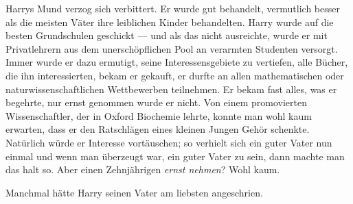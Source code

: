 Harrys Mund verzog sich verbittert. Er wurde gut behandelt, vermutlich besser als die meisten Väter ihre leiblichen Kinder behandelten. Harry wurde auf die besten Grundschulen geschickt — und als das nicht ausreichte, wurde er mit Privatlehrern aus dem unerschöpflichen Pool an verarmten Studenten versorgt. Immer wurde er dazu ermutigt, seine Interessensgebiete zu vertiefen, alle Bücher, die ihn interessierten, bekam er gekauft, er durfte an allen mathematischen oder naturwissenschaftlichen Wettbewerben teilnehmen. Er bekam fast alles, was er begehrte, nur ernst genommen wurde er nicht. Von einem promovierten Wissenschaftler, der in Oxford Biochemie lehrte, konnte man wohl kaum erwarten, dass er den Ratschlägen eines kleinen Jungen Gehör schenkte. Natürlich würde er Interesse vortäuschen; so verhielt sich ein guter Vater nun einmal und wenn man überzeugt war, ein guter Vater zu sein, dann machte man das halt so. Aber einen Zehnjährigen \emph{ernst nehmen}? Wohl kaum.

Manchmal hätte Harry seinen Vater am liebsten angeschrien.

